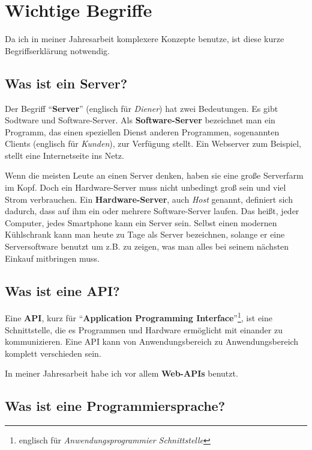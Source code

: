 \documentclass[a4paper, ngerman, 11pt]{scrartcl}
\begin{document}
\section{Wichtige Begriffe}
Da ich in meiner Jahresarbeit komplexere Konzepte benutze, ist diese kurze Begriffserklärung notwendig.

\subsection{Was ist ein Server?}
Der Begriff \enquote{\textbf{Server}} (englisch für \textit{Diener}) hat zwei Bedeutungen.
Es gibt Sodtware und Soft\-ware-Ser\-ver.
Als \textbf{Soft\-ware-Ser\-ver} bezeichnet man ein Programm, das einen speziellen Dienst anderen Programmen, sogenannten Clients (englisch für \textit{Kunden}), zur Verfügung stellt.
Ein Webserver zum Beispiel, stellt eine Internetseite ins Netz.~\autocite[ver.][]{IonosServer}

Wenn die meisten Leute an einen Server denken, haben sie eine große Serverfarm im Kopf.
Doch ein Hard\-ware-Ser\-ver muss nicht unbedingt groß sein und viel Strom verbrauchen.
Ein \textbf{Hard\-ware-Ser\-ver}, auch \textit{Host} genannt, definiert sich dadurch, dass auf ihm ein oder mehrere Soft\-ware-Ser\-ver laufen.
Das heißt, jeder Computer, jedes Smartphone kann ein Server sein.
Selbst einen modernen Kühlschrank kann man heute zu Tage als Server bezeichnen, solange er eine Serversoftware benutzt um z.B. zu zeigen, was man alles bei seinem nächsten Einkauf mitbringen muss.

\subsection{Was ist eine API?}\label{sec:api}

Eine \textbf{API}, kurz für \enquote{\textbf{Application Programming Interface}}\footnote{englisch für \textit{An\-wen\-dungs\-pro\-gram\-mier Schnittstelle}}, ist eine Schnittstelle, die es Programmen und Hardware ermöglicht mit einander zu kommunizieren.
Eine API kann von Anwendungsbereich zu Anwendungsbereich komplett verschieden sein.~\autocite[][]{GSApi}


In meiner Jahresarbeit habe ich vor allem \textbf{Web-APIs} benutzt.

\subsection{Was ist eine Programmiersprache?}
\end{document}
